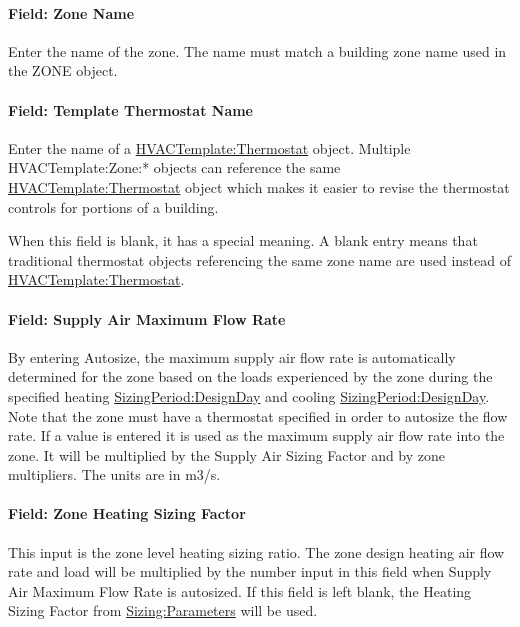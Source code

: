 \paragraph{Field: Zone Name}\label{field-zone-name-2-002}

Enter the name of the zone. The name must match a building zone name used in the ZONE object.

\paragraph{Field: Template Thermostat Name}\label{field-template-thermostat-name-2}

Enter the name of a \hyperref[hvactemplatethermostat]{HVACTemplate:Thermostat} object. Multiple HVACTemplate:Zone:* objects can reference the same \hyperref[hvactemplatethermostat]{HVACTemplate:Thermostat} object which makes it easier to revise the thermostat controls for portions of a building.

When this field is blank, it has a special meaning. A blank entry means that traditional thermostat objects referencing the same zone name are used instead of \hyperref[hvactemplatethermostat]{HVACTemplate:Thermostat}.

\paragraph{Field: Supply Air Maximum Flow Rate}\label{field-supply-air-maximum-flow-rate}

By entering Autosize, the maximum supply air flow rate is automatically determined for the zone based on the loads experienced by the zone during the specified heating \hyperref[sizingperioddesignday]{SizingPeriod:DesignDay} and cooling \hyperref[sizingperioddesignday]{SizingPeriod:DesignDay}. Note that the zone must have a thermostat specified in order to autosize the flow rate. If a value is entered it is used as the maximum supply air flow rate into the zone. It will be multiplied by the Supply Air Sizing Factor and by zone multipliers. The units are in m3/s.

\paragraph{Field: Zone Heating Sizing Factor}\label{field-zone-heating-sizing-factor-1}

This input is the zone level heating sizing ratio. The zone design heating air flow rate and load will be multiplied by the number input in this field when Supply Air Maximum Flow Rate is autosized. If this field is left blank, the Heating Sizing Factor from \hyperref[sizingparameters]{Sizing:Parameters} will be used.

